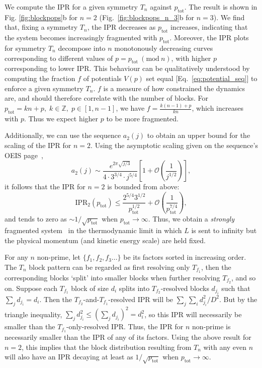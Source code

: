 \documentclass[aps,prx,10pt,twocolumn,amsmath,amssymb,superscriptaddress]{revtex4-2}
\newcommand{\ptot}{p_{\mathrm{tot}}}
\newcommand{\Mod}[1]{\ (\mathrm{mod}\ #1)}
\theoremstyle{definition}
\theoremstyle{definition}
\begin{document}
We compute the IPR for a given symmetry $T_n$ against $\ptot$. The result is shown in Fig. \ref{fig:blockpops}b for $n=2$ (Fig.~\ref{fig:blockpops_n_3}b for $n=3$). We find that, fixing a symmetry $T_n$, the IPR decreases as $\ptot$ increases, indicating that the system becomes increasingly fragmented with $\ptot$.
Moreover, the IPR plots for symmetry $T_n$ decompose into $n$ monotonously decreasing curves corresponding to different values of $p = \ptot \Mod n$, with higher $p$ corresponding to lower IPR. This behaviour can be qualitatively understood by computing the fraction $f$ of potentials $V(p)$ set equal [Eq.~\eqref{eq:potential_seq}] to enforce a given symmetry $T_n$. $f$ is a measure of how constrained the dynamics are, and should therefore correlate with the number of blocks. For $\ptot = kn + p, \; k \in \mathbb{Z}, \; p \in [1, n - 1]$, we have $f = \frac{k(n-1) + p}{kn}$, which increases with $p$. Thus we expect higher $p$ to be more fragmented.

Additionally, we can use the sequence $a_2(j)$ to obtain an upper bound for the scaling of the IPR for $n=2$. Using the asymptotic scaling given on the sequence's OEIS page~\cite{OEIS_sequence},
\begin{equation}
    a_2(j) \sim \frac{e^{2\pi\sqrt{j/3}}}{4 \cdot 3^{3/4}\cdot j^{5/4}}\left[1 + \mathcal{O}\left(\frac{1}{j^{1/2}}\right)\right],
\end{equation}
it follows that the IPR for $n=2$ is bounded from above:
\begin{equation}
    \text{IPR}_2(\ptot) \leq \frac{2^{5/4}3^{1/2}}{\ptot^{1/2}} + \mathcal{O}\left(\frac{1}{\ptot^{7/4}}\right),
\end{equation} 
and tends to zero as $\sim 1/\sqrt{\ptot}$ when $\ptot \rightarrow \infty$. 
Thus, we obtain a \textit{strongly} fragmented system~\cite{Moudgalya_2022} in the thermodynamic limit in which $L$ is sent to infinity but the physical momentum (and kinetic energy scale) are held fixed.

For any $n$ non-prime, let $\{f_{1}, f_{2}, f_{3}...\}$ be its factors sorted in increasing order. The $T_n$ block pattern can be regarded as first resolving only $T_{f_1}$, then the corresponding blocks `split' into smaller blocks when further resolving $T_{f_2}$, and so on. Suppose each $T_{f_1}$ block of size $d_i$ splits into $T_{f_2}$-resolved blocks $d_{j_i}$ such that $\sum_j d_{j_i} = d_i$. Then the $T_{f_2}$-and-$T_{f_1}$-resolved IPR will be $\sum_j \sum_i d_{j_i}^2/D^2$. But by the triangle inequality, $\sum_j d_{j_i}^2 \leq {(\sum_j d_{j_i})}^2 = d_i^2$, so this IPR will necessarily be smaller than the $T_{f_1}$-only-resolved IPR. Thus, the IPR for $n$ non-prime is necessarily smaller than the IPR of any of its factors. Using the above result for $n=2$, this implies that the block distribution resulting from $T_n$ with any even $n$ will also have an IPR decaying at least as $1/\sqrt{\ptot}$ when $\ptot \rightarrow \infty$.
\end{document}
